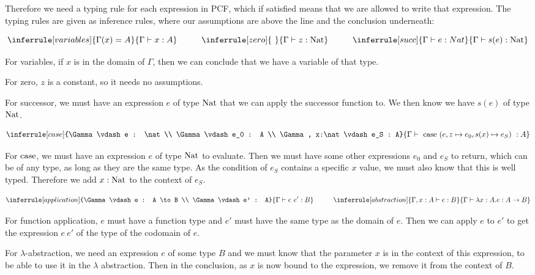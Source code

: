 Therefore we need a typing rule for each expression in PCF, which if satisfied means that we are allowed to write that expression. The typing rules are given as inference rules, where our assumptions are above the line and the conclusion underneath:

$$
\inferrule [variables]{ \Gamma(x) = A }
 {\Gamma \vdash x : A}
\hspace{1cm}
\inferrule [zero]{ \ }
 {\Gamma \vdash z : \nat}
\hspace{1cm}
\inferrule [succ]{ \Gamma \vdash e : Nat }
 {\Gamma \vdash s(e) : \nat}
$$

For variables, if $x$ is in the domain of $\Gamma$, then we can conclude that we have a variable of that type.

For zero, $z$ is a constant, so it needs no assumptions.

For successor, we must have an expression $e$ of type $\operatorname{Nat}$ that we can apply the successor function to. We then know we have $s(e)$ of type $\operatorname{Nat}$.

$$
\inferrule [case]{\Gamma \vdash e : \nat \\  \Gamma \vdash e_0 : A \\  \Gamma , x:\nat\vdash e_S : A}
  {\Gamma \vdash \ \case \ (e, z \mapsto e_0 , s(x) \mapsto e_S) \  : A}  
$$

For $\operatorname{case}$, we must have an expression $e$ of type $\operatorname{Nat}$ to evaluate. Then we must have some other expressions $e_0$ and $e_S$ to return, which can be of any type, as long as they are the same type. As the condition of $e_S$ contains a specific $x$ value, we must also know that this is well typed. Therefore we add $x : \operatorname{Nat}$ to the context of $e_S$.

$$
\inferrule [application]{\Gamma \vdash e : A \to B \\  \Gamma \vdash e' : A}
  {\Gamma \vdash e \ e' : B}
  \hspace{1cm}
\inferrule [abstraction] {\Gamma , x : A \vdash  e : B}
  {\Gamma \vdash \lambda x : A. e : A \to B}  
$$

For function application, $e$ must have a function type and $e'$ must have the same type as the domain of $e$. Then we can apply $e$ to $e'$ to get the expression $e \ e'$ of the type of the codomain of $e$.

For $\lambda$-abstraction, we need an expression $e$ of some type $B$ and we must know that the parameter $x$ is in the context of this expression, to be able to use it in the $\lambda$ abstraction. Then in the conclusion, as $x$ is now bound to the expression, we remove it from the context of $B$.

